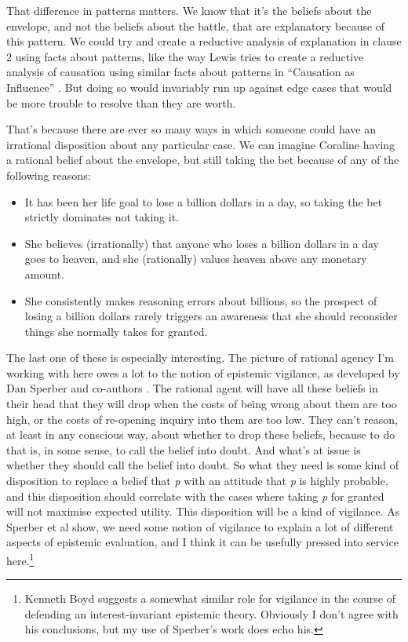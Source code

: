 \documentclass[
  11pt,
]{book}
\providecommand{\tightlist}{%
  \setlength{\itemsep}{0pt}\setlength{\parskip}{0pt}}
\begin{document}
That difference in patterns matters. We know that it's the beliefs about the envelope, and not the beliefs about the battle, that are explanatory because of this pattern. We could try and create a reductive analysis of explanation in clause 2 using facts about patterns, like the way Lewis tries to create a reductive analysis of causation using similar facts about patterns in ``Causation as Influence'' \citep{Lewis2004a}. But doing so would invariably run up against edge cases that would be more trouble to resolve than they are worth.

That's because there are ever so many ways in which someone could have an irrational disposition about any particular case. We can imagine Coraline having a rational belief about the envelope, but still taking the bet because of any of the following reasons:

\begin{itemize}
\tightlist
\item
  It has been her life goal to lose a billion dollars in a day, so taking the bet strictly dominates not taking it.
\item
  She believes (irrationally) that anyone who loses a billion dollars in a day goes to heaven, and she (rationally) values heaven above any monetary amount.
\item
  She consistently makes reasoning errors about billions, so the prospect of losing a billion dollars rarely triggers an awareness that she should reconsider things she normally takes for granted.
\end{itemize}

The last one of these is especially interesting. The picture of rational agency I'm working with here owes a lot to the notion of epistemic vigilance, as developed by Dan Sperber and co-authors \citep{SperberEtAl2010}. The rational agent will have all these beliefs in their head that they will drop when the costs of being wrong about them are too high, or the costs of re-opening inquiry into them are too low. They can't reason, at least in any conscious way, about whether to drop these beliefs, because to do that is, in some sense, to call the belief into doubt. And what's at issue is whether they should call the belief into doubt. So what they need is some kind of disposition to replace a belief that \emph{p} with an attitude that \emph{p} is highly probable, and this disposition should correlate with the cases where taking \emph{p} for granted will not maximise expected utility. This disposition will be a kind of vigilance. As Sperber et al show, we need some notion of vigilance to explain a lot of different aspects of epistemic evaluation, and I think it can be usefully pressed into service here.\footnote{Kenneth Boyd \citeyearpar{Boyd2015} suggests a somewhat similar role for vigilance in the course of defending an interest-invariant epistemic theory. Obviously I don't agree with his conclusions, but my use of Sperber's work does echo his.}
\end{document}
